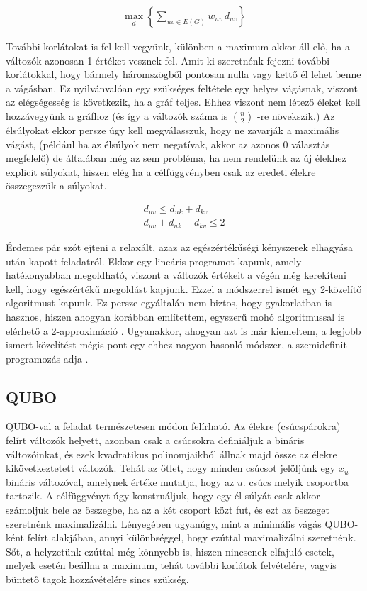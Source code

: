 \begin{align}
	\max_{d} \left\{ \sum_{uv\in E(G)}{w_{uv} \, d_{uv}}\right\}
\end{align}

További korlátokat is fel kell vegyünk, különben a maximum akkor áll elő, ha a változók azonosan 1 értéket vesznek fel.
Amit ki szeretnénk fejezni további korlátokkal, hogy bármely háromszögből pontosan nulla vagy kettő él lehet benne a vágásban. Ez nyilvánvalóan egy szükséges feltétele egy helyes vágásnak, viszont az elégségesség is következik, ha a gráf teljes. Ehhez viszont nem létező éleket kell hozzávegyünk a gráfhoz (és így a változók száma is $\binom{n}{2}$ -re növekszik.) Az élsúlyokat ekkor persze úgy kell megválasszuk, hogy ne zavarják a maximális vágást, (például ha az élsúlyok nem negatívak, akkor az azonos 0 választás megfelelő) de általában még az sem probléma, ha nem rendelünk az új élekhez explicit súlyokat, hiszen elég ha a célfüggvényben csak az eredeti élekre összegezzük a súlyokat.

\begin{align}
 d_{uv} \leq d_{uk}+d_{kv}  \\
 d_{uv}+d_{uk}+d_{kv} \leq 2  
\end{align}

Érdemes pár szót ejteni a relaxált, azaz az egészértékűségi kényszerek elhagyása után kapott feladatról. Ekkor egy lineáris programot kapunk, amely hatékonyabban megoldható, viszont a változók értékeit a végén még kerekíteni kell, hogy egészértékű megoldást kapjunk. Ezzel a módszerrel ismét egy 2-közelítő algoritmust kapunk. Ez persze egyáltalán nem biztos, hogy gyakorlatban is hasznos, hiszen ahogyan korábban említettem, egyszerű mohó algoritmussal is elérhető a 2-approximáció \cite{10.5555/1283383.1283390, POLJAK1994191}.
Ugyanakkor, ahogyan azt is már kiemeltem, a legjobb ismert közelítést mégis pont egy ehhez nagyon hasonló módszer, a szemidefinit programozás adja \cite{10.1145/227683.227684}.


\subsection{QUBO}\label{sec:theoryMaxCutQUBO}

QUBO-val a feladat természetesen módon felírható. Az élekre (csúcspárokra) felírt változók helyett, azonban csak a csúcsokra definiáljuk a bináris változóinkat, és ezek kvadratikus polinomjaikból állnak majd össze az élekre kikövetkeztetett változók. Tehát az ötlet, hogy minden csúcsot jelöljünk egy $x_u$ bináris változóval, amelynek értéke mutatja, hogy az $u.$ csúcs melyik csoportba tartozik. A célfüggvényt úgy konstruáljuk, hogy egy él súlyát csak akkor számoljuk bele az összegbe, ha az a két csoport közt fut, és ezt az összeget szeretnénk maximalizálni.
Lényegében ugyanúgy, mint a minimális vágás QUBO-ként felírt alakjában, annyi különbséggel, hogy ezúttal maximalizálni szeretnénk. Sőt, a helyzetünk ezúttal még könnyebb is, hiszen nincsenek elfajuló esetek, melyek esetén beállna a maximum, tehát további korlátok felvételére, vagyis büntető tagok hozzávételére sincs szükség.

